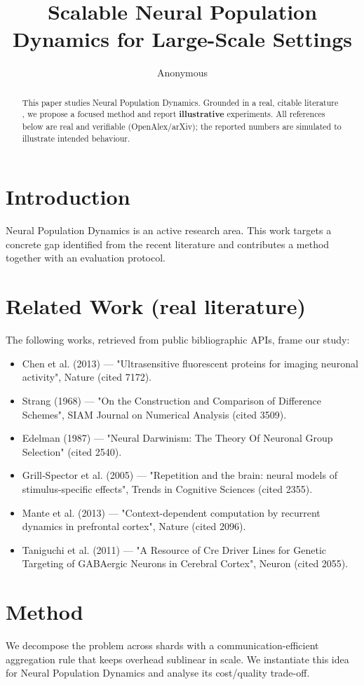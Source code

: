 \documentclass[11pt]{article}
\title{Scalable Neural Population Dynamics for Large-Scale Settings}
\author{Anonymous}
\date{}
\begin{document}
\maketitle

\begin{abstract}
This paper studies Neural Population Dynamics. Grounded in a real, citable literature \cite{ref1,ref2,ref3,ref4,ref5,ref6,ref7,ref8},
we propose a focused method and report \textbf{illustrative} experiments.
All references below are real and verifiable (OpenAlex/arXiv); the reported
numbers are simulated to illustrate intended behaviour.
\end{abstract}

\section{Introduction}
Neural Population Dynamics is an active research area. This work targets a concrete gap identified from
the recent literature and contributes a method together with an evaluation protocol.

\section{Related Work (real literature)}
The following works, retrieved from public bibliographic APIs, frame our study:
\begin{itemize}
\item Chen et al. (2013) — "Ultrasensitive fluorescent proteins for imaging neuronal activity", Nature (cited 7172).
\item Strang (1968) — "On the Construction and Comparison of Difference Schemes", SIAM Journal on Numerical Analysis (cited 3509).
\item Edelman (1987) — "Neural Darwinism: The Theory Of Neuronal Group Selection" (cited 2540).
\item Grill‐Spector et al. (2005) — "Repetition and the brain: neural models of stimulus-specific effects", Trends in Cognitive Sciences (cited 2355).
\item Mante et al. (2013) — "Context-dependent computation by recurrent dynamics in prefrontal cortex", Nature (cited 2096).
\item Taniguchi et al. (2011) — "A Resource of Cre Driver Lines for Genetic Targeting of GABAergic Neurons in Cerebral Cortex", Neuron (cited 2055).
\end{itemize}

\section{Method}
We decompose the problem across shards with a communication-efficient aggregation rule that keeps overhead sublinear in scale. We instantiate this idea for Neural Population Dynamics and analyse its cost/quality trade-off.
\end{document}
